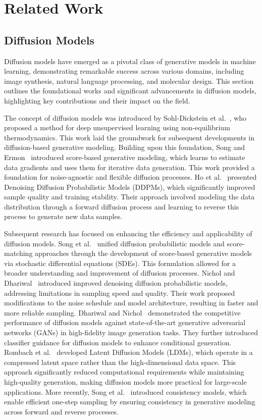\section{Related Work}

\subsection{Diffusion Models}

Diffusion models have emerged as a pivotal class of generative models in machine learning, demonstrating remarkable success across various domains, including image synthesis, natural language processing, and molecular design. This section outlines the foundational works and significant advancements in diffusion models, highlighting key contributions and their impact on the field.

The concept of diffusion models was introduced by Sohl-Dickstein et al.~\cite{Sohl2015}, who proposed a method for deep unsupervised learning using non-equilibrium thermodynamics. This work laid the groundwork for subsequent developments in diffusion-based generative modeling. Building upon this foundation, Song and Ermon~\cite{Song2019} introduced score-based generative modeling, which learns to estimate data gradients and uses them for iterative data generation. This work provided a foundation for noise-agnostic and flexible diffusion processes. Ho et al.~\cite{Ho2020} presented Denoising Diffusion Probabilistic Models (DDPMs), which significantly improved sample quality and training stability. Their approach involved modeling the data distribution through a forward diffusion process and learning to reverse this process to generate new data samples.

Subsequent research has focused on enhancing the efficiency and applicability of diffusion models. Song et al.~\cite{Song2021scorebased} unified diffusion probabilistic models and score-matching approaches through the development of score-based generative models via stochastic differential equations (SDEs). This formulation allowed for a broader understanding and improvement of diffusion processes. Nichol and Dhariwal~\cite{Nichol2021} introduced improved denoising diffusion probabilistic models, addressing limitations in sampling speed and quality. Their work proposed modifications to the noise schedule and model architecture, resulting in faster and more reliable sampling. Dhariwal and Nichol~\cite{Dhariwal2021} demonstrated the competitive performance of diffusion models against state-of-the-art generative adversarial networks (GANs) in high-fidelity image generation tasks. They further introduced classifier guidance for diffusion models to enhance conditional generation. Rombach et al.~\cite{Rombach2022} developed Latent Diffusion Models (LDMs), which operate in a compressed latent space rather than the high-dimensional data space. This approach significantly reduced computational requirements while maintaining high-quality generation, making diffusion models more practical for large-scale applications. More recently, Song et al.~\cite{Song2023} introduced consistency models, which enable efficient one-step sampling by ensuring consistency in generative modeling across forward and reverse processes.

